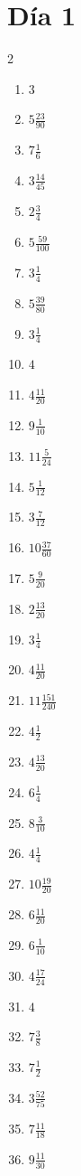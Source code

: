 \documentclass[12pt]{article}
\begin{document}
\section*{Día 1}
\begin{multicols}{2}\begin{enumerate}
\item $ 3 $
\item $ 5 \frac{23}{90} $
\item $ 7 \frac{1}{6} $
\item $ 3 \frac{14}{45} $
\item $ 2 \frac{3}{4} $
\item $ 5 \frac{59}{100} $
\item $ 3 \frac{1}{4} $
\item $ 5 \frac{39}{80} $
\item $ 3 \frac{1}{4} $
\item $ 4 $
\item $ 4 \frac{11}{20} $
\item $ 9 \frac{1}{10} $
\item $ 11 \frac{5}{24} $
\item $ 5 \frac{1}{12} $
\item $ 3 \frac{7}{12} $
\item $ 10 \frac{37}{60} $
\item $ 5 \frac{9}{20} $
\item $ 2 \frac{13}{20} $
\item $ 3 \frac{1}{4} $
\item $ 4 \frac{11}{20} $
\item $ 11 \frac{151}{240} $
\item $ 4 \frac{1}{2} $
\item $ 4 \frac{13}{20} $
\item $ 6 \frac{1}{4} $
\item $ 8 \frac{3}{10} $
\item $ 4 \frac{1}{4} $
\item $ 10 \frac{19}{20} $
\item $ 6 \frac{11}{20} $
\item $ 6 \frac{1}{10} $
\item $ 4 \frac{17}{24} $
\item $ 4 $
\item $ 7 \frac{3}{8} $
\item $ 7 \frac{1}{2} $
\item $ 3 \frac{52}{75} $
\item $ 7 \frac{11}{18} $
\item $ 9 \frac{11}{30} $

\end{enumerate}
\end{multicols}
\end{document}
